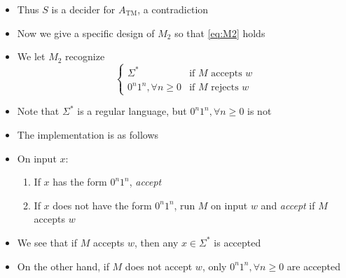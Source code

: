 \begin{frame}[allowframebreaks]
\begin{itemize}
  \item Thus $S$ is a decider for $A_{\text{TM}}$, a
  contradiction
\item Now we give a specific design of $M_2$ so that
\eqref{eq:M2} holds
\item We let $M_2$ recognize
  \begin{equation*}
    \begin{cases}
      \Sigma^* & \text{if $M$ accepts $w$} \\
      0^n1^n, \forall n \geq 0 & \text{if $M$ rejects $w$}
    \end{cases}
  \end{equation*}
    \item Note that $\Sigma^*$ is a regular
    language, but $0^n1^n, \forall n\geq 0$ is not
  \item The implementation is as follows
  \item [] On input $x$:
    \begin{enumerate}
    \item If $x$ has the form $0^n1^n$, {\em accept}
    \item If $x$ does not have the form $0^n1^n$, run
      $M$ on input $w$ and {\em accept} if $M$ accepts $w$
    \end{enumerate}
  \item We see that if $M$ accepts $w$, then any
    $x \in \Sigma^*$ is accepted
  \item On the other hand, if $M$ does not accept $w$,
    only $0^n1^n, \forall n \geq 0$ are accepted
\end{itemize}\end{frame} 


